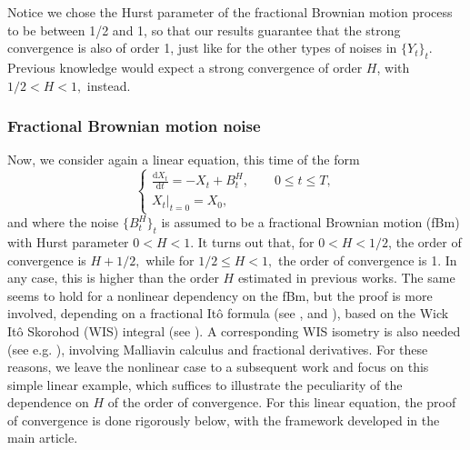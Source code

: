 \documentclass[reqno,12pt]{amsart}
\theoremstyle{plain} %
\theoremstyle{definition} %
\begin{document}
Notice we chose the Hurst parameter of the fractional Brownian motion process to be between 1/2 and 1, so that our results guarantee that the strong convergence is also of order 1, just like for the other types of noises in $\{{Y}_t\}_t$. Previous knowledge would expect a strong convergence of order $H$, with $1/2 < H < 1,$ instead.

\subsubsection{Fractional Brownian motion noise}
\label{secfBmnoise}

Now, we consider again a linear equation, this time of the form
\begin{equation}
    \label{linearnonhomogeneousfbm}
    \begin{cases}
        \displaystyle \frac{\mathrm{d}X_t}{\mathrm{d} t} = -X_t + B^H_t, \qquad 0 \leq t \leq T, \\
        \left. X_t \right|_{t = 0} = X_0,
      \end{cases}
\end{equation}
and where the noise $\{B^H_t\}_t$ is assumed to be a fractional Brownian motion (fBm) with Hurst parameter $0 < H < 1$. It turns out that, for $0 < H < 1/2$, the order of convergence is $H + 1/2,$ while for $1/2\leq H < 1,$ the order of convergence is 1. In any case, this is higher than the order $H$ estimated in previous works. The same seems to hold for a nonlinear dependency on the fBm, but the proof is more involved, depending on a fractional It\^o formula (see \cite[Theorem 4.2.6]{BHOB2008}, \cite[Theorem 4.1]{BENDER200381}and \cite[Theorem 2.7.4]{Mishura2008}), based on the Wick It\^o Skorohod (WIS) integral (see \cite[Chapter 4]{BHOB2008}). A corresponding WIS isometry is also needed (see e.g. \cite[Theorem 4.5.6]{BHOB2008}), involving Malliavin calculus and fractional derivatives. For these reasons, we leave the nonlinear case to a subsequent work and focus on this simple linear example, which suffices to illustrate the peculiarity of the dependence on $H$ of the order of convergence. For this linear equation, the proof of convergence is done rigorously below, with the framework developed in the main article.
\end{document}
